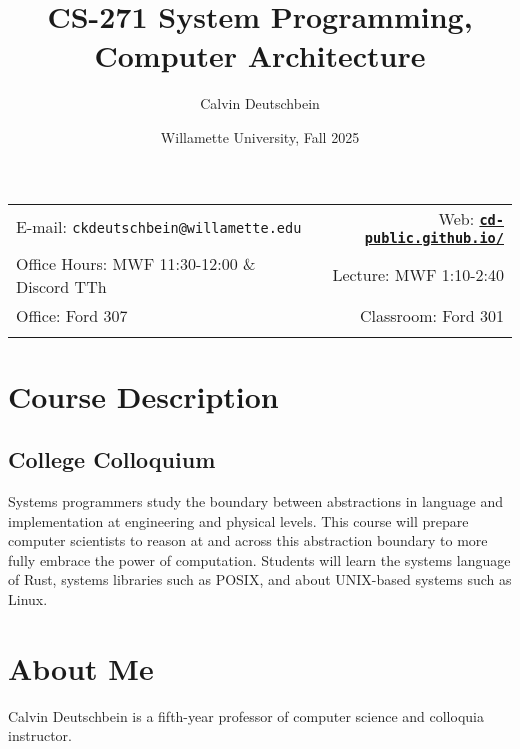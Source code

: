 \documentclass[11pt]{article}
\title{CS-271 System Programming, Computer Architecture}
\author{Calvin Deutschbein}
\date{Willamette University, Fall 2025}
\newcommand{\blankline}{\quad\pagebreak[2]}
\begin{document}
\maketitle

\blankline

\begin{tabular*}{.93\textwidth}{@{\extracolsep{\fill}}lr}


E-mail: \texttt{ckdeutschbein@willamette.edu} & Web: \href{https://cd-public.github.io/courses/soc}{\tt\bf cd-public.github.io/}  \\

 Office Hours: MWF 11:30-12:00 \& Discord TTh  &  Lecture: MWF 1:10-2:40 \\

 Office: Ford 307 & Classroom: Ford 301  \\
 & \\
\hline
\end{tabular*}

\vspace{5 mm}


\section*{Course Description}

\subsection*{College Colloquium}

Systems programmers study the boundary between abstractions in language and implementation at engineering and physical levels. This course will prepare computer scientists to reason at and across this abstraction boundary to more fully embrace the power of computation. Students will learn the systems language of Rust, systems libraries such as POSIX, and about UNIX-based systems such as Linux.

\section*{About Me}
Calvin Deutschbein is a 
fifth-year professor of computer science and colloquia instructor.

\end{document}
